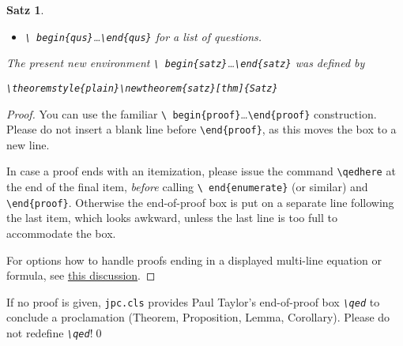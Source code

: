 \documentclass{CSLM} %
\theoremstyle{plain}\newtheorem{satz}[thm]{Satz} %
\begin{document}
\begin{satz}
\begin{itemize}
\begin{itemize}
{{    begin\{qu\}}\dots\texttt{\textbackslash end\{qu\}}} for a single question;
\item\emph{\texttt{\textbackslash
    begin\{qus\}}\dots\texttt{\textbackslash end\{qus\}}} for a list of questions.
\end{itemize}
\end{itemize}
  The present new environment \emph{\texttt{\textbackslash
    begin\{satz\}}\dots\texttt{\textbackslash end\{satz\}}} was defined
  by
\begin{center}
  \emph{\texttt{\textbackslash theoremstyle\{plain\}\textbackslash newtheorem\{satz\}[thm]\{Satz\}}}
\end{center}
\end{satz}

\begin{proof} You can use the familiar \texttt{\textbackslash
    begin\{proof\}}\dots\texttt{\textbackslash end\{proof\}}
  construction.  Please do not insert a blank line before
  \texttt{\textbackslash end\{proof\}}, as this moves the box to a new
  line.  

  In case a proof ends with an itemization,
  please issue the command \texttt{\textbackslash qedhere} at the end
  of the final item, \emph{before} calling \texttt{\textbackslash
    end\{enumerate\}} (or similar) and \texttt{\textbackslash end\{proof\}}.
  Otherwise the end-of-proof box is put on a separate line
  following the last item, which looks awkward, unless the last line
  is too full to accommodate the box.

  For options how to handle proofs ending in a displayed multi-line
  equation or formula, see
  \href{http://tex.stackexchange.com/questions/101929/qed-or-qedhere-at-the-end-of-split-environment}{this
    discussion}.
\end{proof}

\begin{cor}\label{C:big}
  If no proof is given, \texttt{jpc.cls} provides Paul Taylor's
  end-of-proof box \emph{\texttt{\textbackslash qed}} to conclude a
  proclamation (Theorem, Proposition, Lemma, Corollary).  Please do
  not redefine \emph{\texttt{\textbackslash qed}}!\qed
\end{cor}
\end{document}
